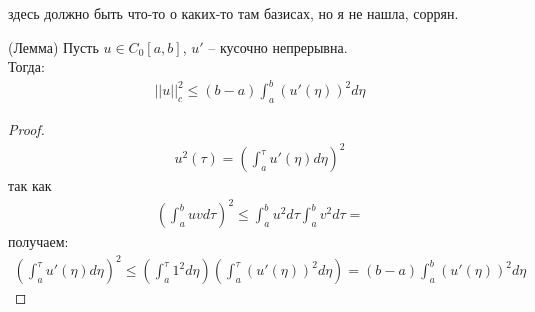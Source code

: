 \documentclass[__main__.tex]{subfiles}
\begin{document}
здесь должно быть что-то о каких-то там базисах, но я не нашла, соррян.\\

\begin{theorem}
	(Лемма) Пусть $u \in C_0[a,b]$, $u'$ -- кусочно непрерывна.\\
	Тогда:
	\begin{gather*}
		||u||^2_c\leqslant (b-a)\int_a^b (u'(\eta))^2d\eta
	\end{gather*}
\end{theorem}
\begin{proof}
	\begin{gather*}
		u^2(\tau)=\left(\int_a^\tau u'(\eta)d\eta\right)^2 
	\end{gather*}
	так как 
	\begin{gather*}
		\left(\int_a^b uvd\tau\right)^2 \leqslant \int_a^b u^2 d\tau \int_a^b v^2 d\tau = 
	\end{gather*}
	получаем:
	\begin{gather*}
		\left(\int_a^\tau u'(\eta)d\eta\right)^2 \leqslant 	\left(\int_a^\tau 1^2 d\eta\right)\left(\int_a^\tau (u'(\eta))^2d\eta\right)=(b-a)\int_a^b (u'(\eta))^2d\eta
	\end{gather*}
\end{proof}
\end{document}
